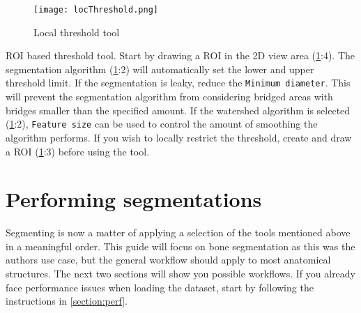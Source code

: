 \begin{figure}[h!]
	\centerline{
		\texttt{[image: locThreshold.png]}}
	\caption{Local threshold tool}\label{fig:lt}
\end{figure}
\noindent
ROI based threshold tool.
Start by drawing a ROI in the 2D view area (\cref{fig:lt}:4).
The segmentation algorithm (\cref{fig:lt}:2) will automatically set the lower and upper threshold limit.
If the segmentation is leaky, reduce the \texttt{Minimum diameter}.
This will prevent the segmentation algorithm from considering bridged areas with bridges smaller than the specified amount.
If the watershed algorithm is selected (\cref{fig:lt}:2), \texttt{Feature size} can be used to control the amount of smoothing the algorithm performs.
If you wish to locally restrict the threshold, create and draw a ROI (\cref{fig:lt}:3) before using the tool.

\pagebreak
\section{Performing segmentations}
Segmenting is now a matter of applying a selection of the tools mentioned above in a meaningful order.
This guide will focus on bone segmentation as this was the authors use case, but the general workflow should apply to most anatomical structures.
\noindent
The next two sections will show you possible workflows.
If you already face performance issues when loading the dataset, start by following the instructions in \cref{section:perf}.

